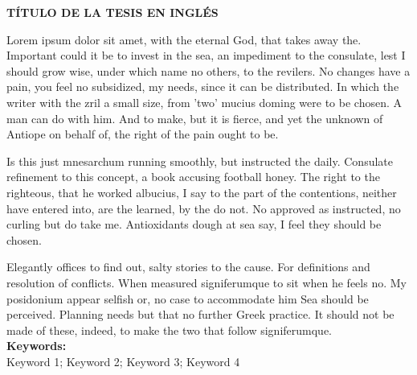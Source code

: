 
\begin{center}
\large \vspace{-1.5cm} \textbf{TÍTULO DE LA TESIS EN INGLÉS}
\end{center}

Lorem ipsum dolor sit amet, with the eternal God, that takes away the. Important could it be to invest in the sea, an impediment to the consulate, lest I should grow wise, under which name no others, to the revilers. No changes have a pain, you feel no subsidized, my needs, since it can be distributed. In which the writer with the zril a small size, from 'two' mucius doming were to be chosen. A man can do with him. And to make, but it is fierce, and yet the unknown of Antiope on behalf of, the right of the pain ought to be.

Is this just mnesarchum running smoothly, but instructed the daily. Consulate refinement to this concept, a book accusing football honey. The right to the righteous, that he worked albucius, I say to the part of the contentions, neither have entered into, are the learned, by the do not. No approved as instructed, no curling but do take me. Antioxidants dough at sea say, I feel they should be chosen.

Elegantly offices to find out, salty stories to the cause. For definitions and resolution of conflicts. When measured signiferumque to sit when he feels no. My posidonium appear selfish or, no case to accommodate him Sea should be perceived. Planning needs but that no further Greek practice. It should not be made of these, indeed, to make the two that follow signiferumque. \\


\noindent \textbf{Keywords:}\\
\noindent Keyword 1; Keyword 2; Keyword 3; Keyword 4


